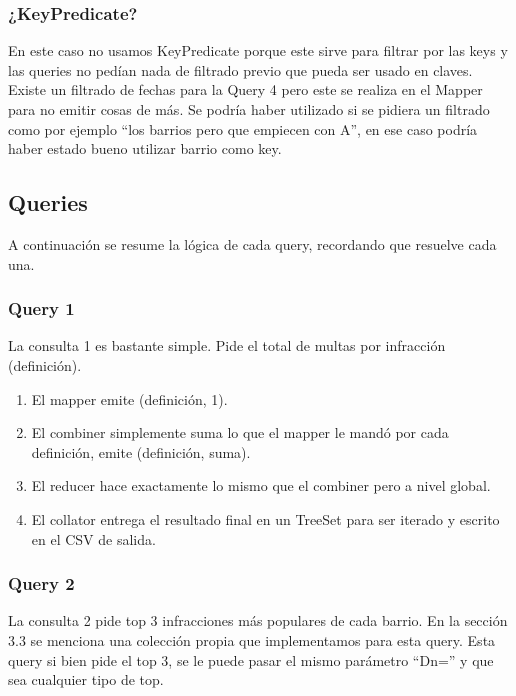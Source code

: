 \documentclass[a4paper,12pt]{article}
\begin{document}
	\subsubsection{¿KeyPredicate?}
	
	En este caso no usamos KeyPredicate porque este sirve para filtrar por las keys y las queries no pedían nada de filtrado previo que pueda ser usado en claves. Existe un filtrado de fechas para la Query 4 pero este se realiza en el Mapper para no emitir cosas de más. Se podría haber utilizado si se pidiera un filtrado como por ejemplo ``los barrios pero que empiecen con A'', en ese caso podría haber estado bueno utilizar barrio como key.
	
	\subsection{Queries}
	
	A continuación se resume la lógica de cada query, recordando que resuelve cada una.
	
	\subsubsection{Query 1}
	
	La consulta 1 es bastante simple. Pide el total de multas por infracción (definición). 
	
	\begin{enumerate}
		\item El mapper emite (definición, 1).
		\item El combiner simplemente suma lo que el mapper le mandó por cada definición, emite (definición, suma).
		\item El reducer hace exactamente lo mismo que el combiner pero a nivel global.
		\item El collator entrega el resultado final en un TreeSet para ser iterado y escrito en el CSV de salida.
	\end{enumerate}

	\subsubsection{Query 2}
	
	La consulta 2 pide top 3 infracciones más populares de cada barrio. En la sección 3.3 se menciona una colección propia que implementamos para esta query. Esta query si bien pide el top 3, se le puede pasar el mismo parámetro ``Dn='' y que sea cualquier tipo de top.
	
\end{document}
